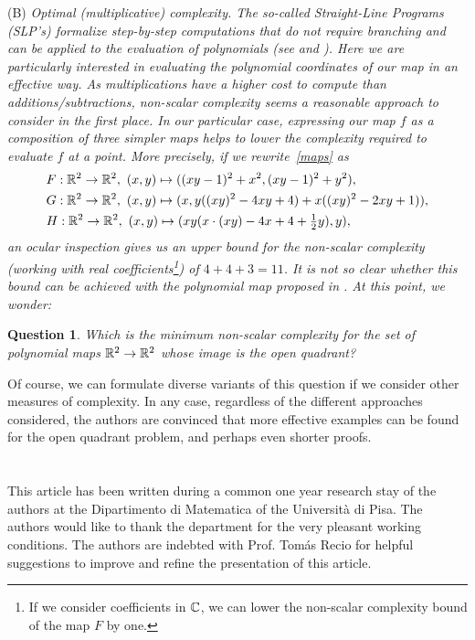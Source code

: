 \documentclass[1p]{elsarticle}
\newtheorem{quest}[thm]{Question}
\begin{document}
\noindent 
(B) \em Optimal (multiplicative) complexity\em. The so-called Straight-Line Programs (SLP's) formalize step-by-step computations that do not require branching and can be applied to the evaluation of polynomials (see \citealt[chap.4]{bcs} and \citealt{w}). Here we are particularly interested in evaluating the polynomial coordinates of our map in an effective way. As multiplications have a higher cost to compute than additions/subtractions, non-scalar complexity seems a reasonable approach to consider in the first place. In our particular case, expressing our map $f$ as a composition of three simpler maps helps to lower the complexity required to evaluate $f$ at a point. More precisely, if we rewrite~\eqref{maps} as
\begin{align}\label{maps2}
&F:{\mathbb R}^2\to{\mathbb R}^2,\  (x,y)\mapsto((xy-1)^2+x^2,(xy-1)^2+y^2),\nonumber\\
&G:{\mathbb R}^2\to{\mathbb R}^2,\  (x,y)\mapsto(x,y((xy)^2-4xy+4)+x((xy)^2-2xy+1)),\\
&H:{\mathbb R}^2\to{\mathbb R}^2,\  (x,y)\mapsto(xy(x\cdot(xy)-4x+4+\tfrac{1}{2}y),y)\nonumber,
\end{align}
an ocular inspection gives us an upper bound for the non-scalar complexity (working with real coefficients\footnote{If we consider coefficients in ${\mathbb C}$, we can lower the non-scalar complexity bound  of the map $F$ by one.}) of $4+4+3=11$. It is not so clear whether this bound can be achieved with the polynomial map proposed in \citet{fg1}. At this point, we wonder:

\begin{quest} 
Which is the minimum non-scalar complexity for the set of polynomial maps ${\mathbb R}^2\to{\mathbb R}^2$ whose image is the open quadrant?
\end{quest}

Of course, we can formulate diverse variants of this question if we consider other measures of complexity.  In any case, regardless of the different approaches considered, the authors are convinced that more effective examples can be found for the open quadrant problem, and perhaps even shorter proofs.

\vspace{-5mm}
\section*{}
 This article has been written during a common one year research stay of the authors at the Dipartimento di Matematica of the Universit\`a di Pisa. The authors would like to thank the department for  the very pleasant working conditions. The authors are indebted with Prof. Tom\'as Recio for helpful suggestions to improve and refine the presentation of this article.  
\end{document}
